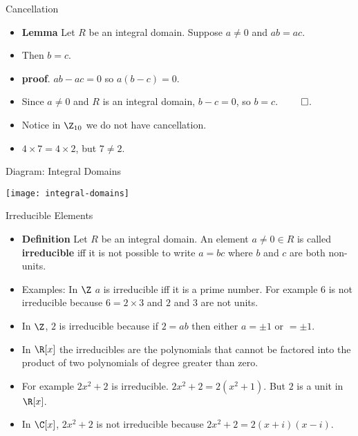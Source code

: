 \documentclass{beamer}
\begin{document}

\begin{frame}{Cancellation}

\begin{itemize}
  \item \textbf{Lemma} Let $R$ be an integral domain. Suppose $a\not=0$ and $ab = ac$.
  \item Then $b=c$.
  \item \textbf{proof}. $ab - ac = 0$ so $a(b-c) = 0$.
  \item Since $a\not=0$ and $R$ is an integral domain, $b-c=0$, so $b=c$. $\qed$.
  \item Notice in $\Z_{10}$ we do not have cancellation.
  \item $4\times 7 = 4 \times 2$, but $7\not= 2$.
\end{itemize}

\end{frame}



\begin{frame}{Diagram: Integral Domains}

\begin{center}
\texttt{[image: integral-domains]}
\end{center}

\end{frame}



\begin{frame}{Irreducible Elements}

\begin{itemize}
  \item \textbf{Definition} Let $R$ be an integral domain. An element $a\not=0\in R$ is called  \textbf{irreducible} iff it is not possible to write $a=bc$ where
  $b$ and $c$ are both non-units.
  \item Examples: In $\Z$ $a$ is irreducible iff it is a prime number. For example $6$ is not irreducible because $6=2\times 3$ and $2$ and $3$ are not units.
  \item In $\Z$, $2$ is irreducible because if $2=ab$ then either $a=\pm1$ or $=\pm1$.
  \item In $\R[x]$ the irreducibles are the polynomials that cannot be factored into the product of two polynomials of degree greater than zero.
  \item For example $2x^2 + 2$ is irreducible. $2x^2 + 2 = 2 (x^2 + 1)$. But $2$ is a unit in $\R[x]$.
  \item In $\C[x]$, $2x^2+2$ is not irreducible because $2x^2+2= 2(x+i)(x-i)$.
\end{itemize}

\end{frame}
\end{document}

